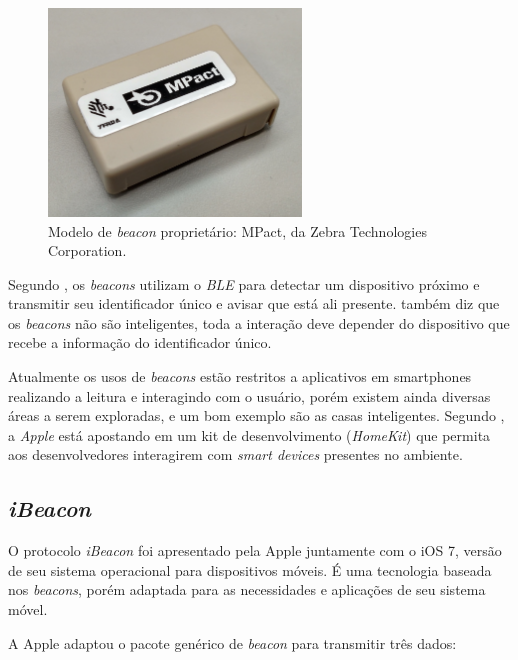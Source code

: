 \begin{figure}[htb]
	\caption{\label{fig:beacon-mpact}Modelo de \textit{beacon} proprietário: MPact, da Zebra Technologies Corporation.}
	\begin{center}
		\includegraphics[width=0.6\textwidth]{img/beacon-mpact.jpg}
	\end{center}
\end{figure}

Segundo , os \textit{beacons} utilizam o \textit{BLE} para detectar um dispositivo próximo e transmitir seu identificador único e avisar que está ali presente.  também diz que os \textit{beacons} não são inteligentes, toda a interação deve depender do dispositivo que recebe a informação do identificador único.

Atualmente os usos de \textit{beacons} estão restritos a aplicativos em smartphones realizando a leitura e interagindo com o usuário, porém existem ainda diversas áreas a serem exploradas, e um bom exemplo são as casas inteligentes. Segundo , a \textit{Apple} está apostando em um kit de desenvolvimento (\textit{HomeKit}) que permita aos desenvolvedores interagirem com \textit{smart devices} presentes no ambiente.

\subsection{\textit{iBeacon}}\label{sec:ibeacon}

O protocolo \textit{iBeacon} foi apresentado pela Apple juntamente com o iOS 7, versão de seu sistema operacional para dispositivos móveis. É uma tecnologia baseada nos \textit{beacons}, porém adaptada para as necessidades e aplicações de seu sistema móvel.

A Apple adaptou o pacote genérico de \textit{beacon} para transmitir três dados:

